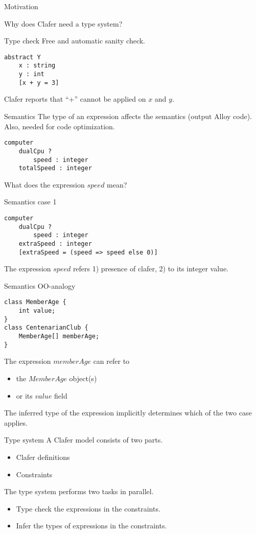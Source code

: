 \documentclass[table,15pt,t]{beamer}
\newcommand{\vmiddle}[1]{
  \vspace{\stretch{1}}
  #1
  \vspace{\stretch{1}}
}
\begin{document}
\begin{frame}{Motivation}
\vmiddle{Why does Clafer need a type system?}
\end{frame}

\begin{frame}[fragile,c]{Type check}
Free and automatic sanity check.
\vfill \begin{lstlisting}
abstract Y
    x : string
    y : int
    [x + y = 3]
\end{lstlisting}
Clafer reports that ``+'' cannot be applied on $x$ and $y$.
\end{frame}

\begin{frame}[fragile,c]{Semantics}
The type of an expression affects the semantics (output Alloy code). Also, needed for code optimization.
\vfill \begin{lstlisting}
computer
    dualCpu ?
        speed : integer
    totalSpeed : integer
\end{lstlisting}
What does the expression $speed$ mean?
\end{frame}

\begin{frame}[fragile,c]{Semantics case 1}
\begin{lstlisting}
computer
    dualCpu ?
        speed : integer
    extraSpeed : integer
    [extraSpeed = (speed => speed else 0)]
\end{lstlisting}
The expression $speed$ refers 1) presence of clafer, 2) to its integer value.
\end{frame}

\begin{frame}[fragile,c]{Semantics OO-analogy}
\lstset{language=Java}
\begin{lstlisting}
class MemberAge {
    int value;
}
class CentenarianClub {
    MemberAge[] memberAge;
}
\end{lstlisting}
The expression $memberAge$ can refer to
\begin{itemize}
\item the $MemberAge$ object(s)
\item or its $value$ field
\end{itemize}

The inferred type of the expression implicitly determines which of the two case applies.
\end{frame}

\begin{frame}[fragile,c]{Type system}
A Clafer model consists of two parts.
\begin{itemize}
\item Clafer definitions
\item Constraints
\end{itemize}

\vfill The type system performs two tasks in parallel.
\begin{itemize}
\item Type check the expressions in the constraints.
\item Infer the types of expressions in the constraints.
\end{itemize}
\end{frame}
\end{document}
